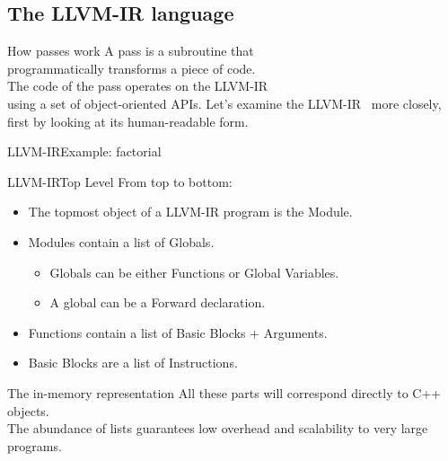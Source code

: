 
\subsection{The LLVM-IR language}


\begin{frame}{How passes work}
\centering
A \alert{pass} is a \alert{subroutine} that \\programmatically
transforms a piece of code.\\
\bigskip
The code of the pass operates on the LLVM-IR \\using a set of
\alert{object-oriented APIs}.
\vfill
Let's examine the LLVM-IR~\cite{LOCAL:www/llvmLanguageRef} more closely,\\
first by looking at its \alert{human-readable} form.
\end{frame}


\begin{frame}{LLVM-IR}{Example: factorial}
\begin{center}
\begin{varwidth}{20cm}
\llvminput[\ttfamily\fontsize{7pt}{5pt}\selectfont]{snippet/fact.ll}
\end{varwidth}
\end{center}
\end{frame}


\begin{frame}{LLVM-IR}{Top Level}
From top to bottom:
\begin{itemize}
\item The topmost object of a LLVM-IR program is the \alert{Module}.
\item \alert{Modules} contain a list of \alert{Globals}.
	\begin{itemize}
	\item {Globals} can be either \alert{Functions} or \alert{Global Variables}.
	\item A global can be a \alert{Forward declaration}.
	\end{itemize}
\item \alert{Functions} contain a list of \alert{Basic Blocks} + \alert{Arguments}.
\item \alert{Basic Blocks} are a list of \alert{Instructions}.
\end{itemize}
\begin{block}{The in-memory representation}
All these parts will correspond directly to \alert{C++ objects}.\\
The abundance of lists guarantees low overhead and scalability to very large programs.
\end{block}
\end{frame}


